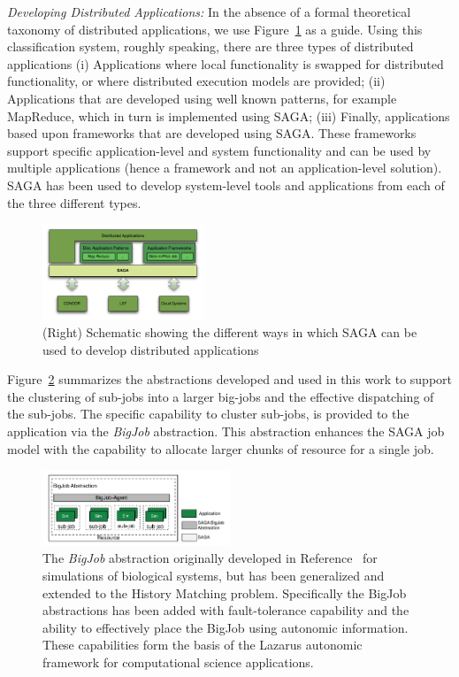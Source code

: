 \documentclass[conference,final]{IEEEtran}
\begin{document}
{\it Developing Distributed Applications: } In the absence of a formal
theoretical taxonomy of distributed applications, we use 
Figure~\ref{sagaapps} as a guide.  Using this classification system,
roughly speaking, there are three types of distributed applications
(i) Applications where local functionality is swapped for distributed
functionality, or where distributed execution models are provided;
(ii) Applications that are developed using well known patterns, for
example MapReduce, which in turn is implemented using SAGA; (iii)
Finally, applications based upon frameworks that are developed using
SAGA. These frameworks support specific application-level and system
functionality and can be used by multiple applications (hence a
framework and not an application-level solution).  SAGA has been used
to develop system-level tools and applications from each of the three
different types.
\begin{figure}[!ht]
  \begin{center}
\includegraphics[width=0.43\textwidth]{saga_platform_figures.pdf}
\end{center}
  \caption{\small(Right) Schematic showing the different ways in which
    SAGA can be used to develop distributed applications}
 \label{sagaapps}
\end{figure}
Figure~\ref{fig:abstractions} summarizes the abstractions developed
and used in this work to support the clustering of sub-jobs into a
larger big-jobs and the effective dispatching of the sub-jobs.  The
specific capability to cluster sub-jobs, is provided to the
application via the \emph{BigJob} abstraction. This abstraction
enhances the SAGA job model with the capability to allocate larger
chunks of resource for a single job.  
\begin{figure}[t]
      \centering
      \includegraphics[width=0.50\textwidth]{./figures/enkf_bigjob.pdf}
      \caption{\footnotesize The {\it BigJob} abstraction originally
        developed in Reference~\cite{saga_royalsoc} for simulations of
        biological systems, but has been generalized and extended to
        the History Matching problem. Specifically the BigJob
        abstractions has been added with fault-tolerance capability
        and the ability to effectively place the BigJob using
        autonomic information. These capabilities form the basis of
        the Lazarus autonomic framework for computational science
        applications.}
      \label{fig:abstractions}
\end{figure}
\end{document}
